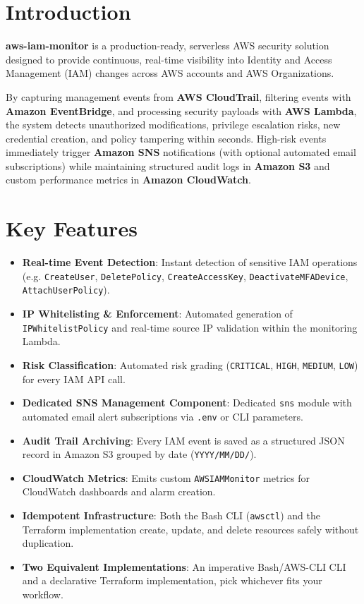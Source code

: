 \documentclass[11pt,a4paper]{report}
\begin{document}
\section{Introduction}

\textbf{aws-iam-monitor} is a production-ready, serverless AWS security
solution designed to provide continuous, real-time visibility into Identity
and Access Management (IAM) changes across AWS accounts and AWS
Organizations.

By capturing management events from \textbf{AWS CloudTrail}, filtering
events with \textbf{Amazon EventBridge}, and processing security payloads
with \textbf{AWS Lambda}, the system detects unauthorized modifications,
privilege escalation risks, new credential creation, and policy tampering
within seconds. High-risk events immediately trigger \textbf{Amazon SNS}
notifications (with optional automated email subscriptions) while
maintaining structured audit logs in \textbf{Amazon S3} and custom
performance metrics in \textbf{Amazon CloudWatch}.

\section{Key Features}

\begin{itemize}[leftmargin=1.4em]
  \item \textbf{Real-time Event Detection}: Instant detection of sensitive IAM operations (e.g. \texttt{CreateUser}, \texttt{DeletePolicy}, \texttt{CreateAccessKey}, \texttt{DeactivateMFADevice}, \texttt{AttachUserPolicy}).
  \item \textbf{IP Whitelisting \& Enforcement}: Automated generation of \texttt{IPWhitelistPolicy} and real-time source IP validation within the monitoring Lambda.
  \item \textbf{Risk Classification}: Automated risk grading (\texttt{CRITICAL}, \texttt{HIGH}, \texttt{MEDIUM}, \texttt{LOW}) for every IAM API call.
  \item \textbf{Dedicated SNS Management Component}: Dedicated \texttt{sns} module with automated email alert subscriptions via \texttt{.env} or CLI parameters.
  \item \textbf{Audit Trail Archiving}: Every IAM event is saved as a structured JSON record in Amazon S3 grouped by date (\texttt{YYYY/MM/DD/}).
  \item \textbf{CloudWatch Metrics}: Emits custom \texttt{AWSIAMMonitor} metrics for CloudWatch dashboards and alarm creation.
  \item \textbf{Idempotent Infrastructure}: Both the Bash CLI (\texttt{awsctl}) and the Terraform implementation create, update, and delete resources safely without duplication.
  \item \textbf{Two Equivalent Implementations}: An imperative Bash/AWS-CLI CLI and a declarative Terraform implementation, pick whichever fits your workflow.
\end{itemize}
\end{document}
